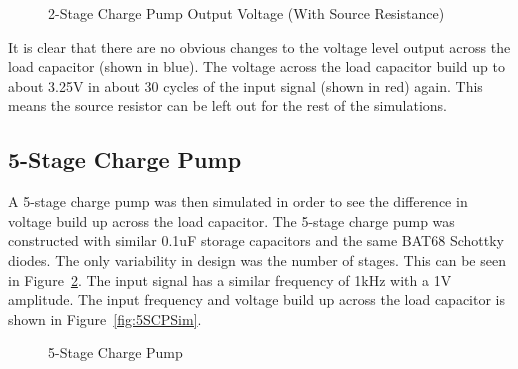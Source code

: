 \documentclass[12pt]{article}
\begin{document}
\begin{figure}[H]
\caption{2-Stage Charge Pump Output Voltage (With Source Resistance)}
\label{fig:2SCP SR Out}
\end{figure}

\noindent It is clear that there are no obvious changes to the voltage level output across the load capacitor (shown in blue). The voltage across the load capacitor build up to about 3.25V in about 30 cycles of the input signal (shown in red) again. This means the source resistor can be left out for the rest of the simulations.

\subsection{5-Stage Charge Pump}

A 5-stage charge pump was then simulated in order to see the difference in voltage build up across the load capacitor. The 5-stage charge pump was constructed with similar 0.1uF storage capacitors and the same BAT68 Schottky diodes. The only variability in design was the number of stages. This can be seen in Figure~\ref{fig:5SCPModel}. The input signal has a similar frequency of 1kHz with a 1V amplitude. The input frequency and voltage build up across the load capacitor is shown in Figure~\ref{fig:5SCPSim}.

\begin{figure}[H]
\caption{5-Stage Charge Pump}
\label{fig:5SCPModel}
\end{figure}
\end{document}
